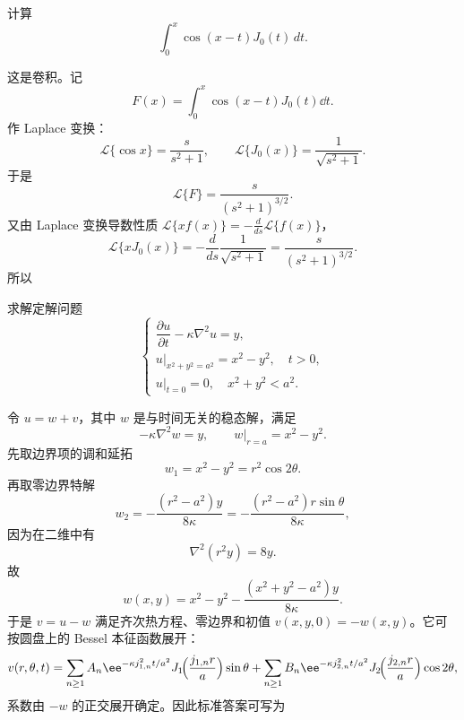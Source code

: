 ﻿

\begin{question}[积分题]

计算
\[
\int_0^x \cos(x-t)J_0(t)\,dt.
\]

\begin{solution}

这是卷积。记
\[
F(x)=\int_0^x \cos(x-t)J_0(t)\dd{t}.
\]
作 Laplace 变换：
\[
\mathcal L\{\cos x\}=\frac{s}{s^2+1},
\qquad
\mathcal L\{J_0(x)\}=\frac{1}{\sqrt{s^2+1}}.
\]
于是
\[
\mathcal L\{F\}=\frac{s}{(s^2+1)^{3/2}}.
\]
又由 Laplace 变换导数性质 $\mathcal L\{xf(x)\}=-\frac{d}{ds}\mathcal L\{f(x)\}$，
\[
\mathcal L\{xJ_0(x)\}=-\frac{d}{ds}\frac{1}{\sqrt{s^2+1}}=\frac{s}{(s^2+1)^{3/2}}.
\]
所以

\end{solution}
\end{question}

\begin{question}[圆盘内热方程]

求解定解问题
\[
\begin{cases}
\dfrac{\partial u}{\partial t}-\kappa\nabla^2u=y,\\
u|_{x^2+y^2=a^2}=x^2-y^2,\quad t>0,\\
u|_{t=0}=0,\quad x^2+y^2<a^2.
\end{cases}
\]

\begin{solution}

令 $u=w+v$，其中 $w$ 是与时间无关的稳态解，满足
\[
-\kappa \nabla^2 w=y,
\qquad w|_{r=a}=x^2-y^2.
\]
先取边界项的调和延拓
\[
 w_1=x^2-y^2=r^2\cos 2\theta.
\]
再取零边界特解
\[
 w_2=-\frac{(r^2-a^2)y}{8\kappa}=-\frac{(r^2-a^2)r\sin\theta}{8\kappa},
\]
因为在二维中有
\[
\nabla^2(r^2 y)=8y.
\]
故
\[
 w(x,y)=x^2-y^2-\frac{(x^2+y^2-a^2)y}{8\kappa}.
\]
于是 $v=u-w$ 满足齐次热方程、零边界和初值 $v(x,y,0)=-w(x,y)$。它可按圆盘上的 Bessel 本征函数展开：
\[
 v(r,\theta,t)=
 \sum_{n\ge1}A_n \ee^{-\kappa j_{1,n}^2 t/a^2}J_1\!\Bigl(\frac{j_{1,n}r}{a}\Bigr)\sin\theta
 +
 \sum_{n\ge1}B_n \ee^{-\kappa j_{2,n}^2 t/a^2}J_2\!\Bigl(\frac{j_{2,n}r}{a}\Bigr)\cos2\theta,
\]
系数由 $-w$ 的正交展开确定。因此标准答案可写为

\end{solution}
\end{question}

